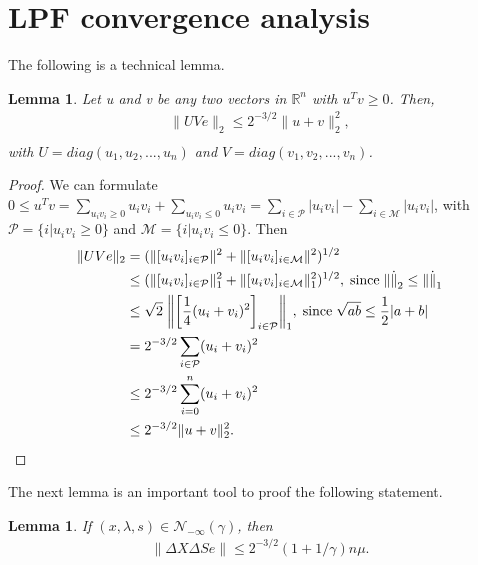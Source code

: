 \documentclass[a4paper,10 pt,titlepage,twoside]{book}
\theoremstyle{plain}
\newtheorem{lem}[thm]{Lemma}
\theoremstyle{definition}
\theoremstyle{remark}
\begin{document}
\section{LPF convergence analysis}
The following is a technical lemma.
\begin{lem}\label{lem1}
	Let u and v be any two vectors in $\mathbb{R}^{n}$ with $u^{T}v \geq 0$. Then, 
	\begin{align*}
	\lVert UVe \rVert_{2}\leq 2^{-3/2}\lVert u + v \rVert^{2}_{2},\\
	\end{align*}
	with $U = diag(u_{1}, u_{2}, ..., u_{n})$ and $V = diag(v_{1}, v_{2}, ..., v_{n})$. 
\end{lem}
\begin{proof}
	We can formulate $0 \leq u^{T}v = \sum\limits_{u_{i}v_{i} \geq 0}u_{i}v_{i} + \sum\limits_{u_{i}v_{i} \leq 0}u_{i}v_{i} = \sum\limits_{i \in \mathcal{P}}|u_{i}v_{i}| - \sum\limits_{i \in \mathcal{M}}|u_{i}v_{i}| $, with $\mathcal{P}= \{i | u_{i}v_{i} \geq 0\}$ and $\mathcal{M}= \{i | u_{i}v_{i} \leq 0\}$.
	Then
	\begin{align*}
	\lVert UVe \rVert_{2} &= ( \lVert[u_{i}v_{i}]_{i \in \mathcal{P}} \rVert^{2} +  \lVert[u_{i}v_{i}]_{i \in \mathcal{M}} \rVert^{2})^{1/2}\\
	&\leq ( \lVert[u_{i}v_{i}]_{i \in \mathcal{P}} \rVert^{2}_{1} +  \lVert[u_{i}v_{i}]_{i \in \mathcal{M}} \rVert^{2}_{1})^{1/2},\; \text{since\;} \lVert\dot\rVert_{2} \leq \lVert\dot\rVert_{1}\\
	&\leq\sqrt{2}\;\bigg\lVert\bigg[\frac{1}{4}(u_{i} + v_{i})^{2}\bigg]_{i\in \mathcal{P}}\bigg\rVert_{1}, \text{\;since\;} \sqrt{ab} \leq \frac{1}{2}|a+b|\\
	& = 2^{-3/2} \sum\limits_{i \in \mathcal{P}}(u_{i} + v_{i})^{2}\\
	& \leq 2^{-3/2} \sum\limits_{i = 0}^{n}(u_{i} + v_{i})^{2}\\
	& \leq 2^{-3/2} \lVert u + v \rVert^{2}_{2}.
	\end{align*}
\end{proof}	
The next lemma is an important tool to proof the following statement.
\begin{lem}\label{lem:ma1}
	If $(x, \lambda, s) \in \mathcal{N}_{-\infty}(\gamma)$, then
	\begin{align*}
	\lVert\Delta X\Delta S e \rVert \leq 2^{-3/2}(1 + 1/ \gamma)n\mu.\\
	\end{align*}
\end{lem}
\end{document}
